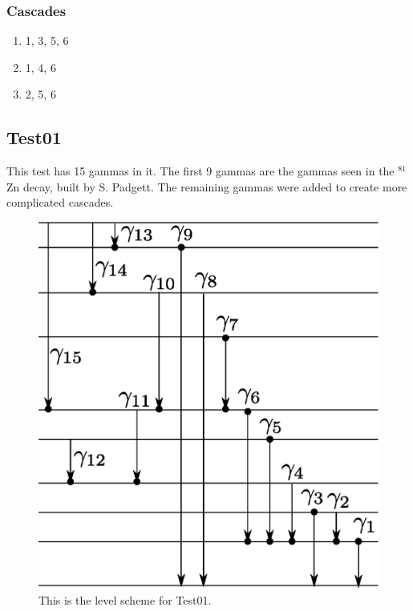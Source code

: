 \documentclass[12pt]{article}
\begin{document}
\subsubsection{Cascades}
\begin{enumerate}
\item 1, 3, 5, 6
\item 1, 4, 6
\item 2, 5, 6
\end{enumerate}
\subsection{Test01}
This test has 15 gammas in it. The first 9 gammas are the gammas seen in the 
$^{81}$Zn decay, built by S. Padgett. The remaining gammas were added to create 
more complicated cascades.
\begin{figure} [t]
  \begin{center}
    \includegraphics[width=4.5in]{../pictures/test01.eps}
    \caption{This is the level scheme for Test01.}
    \label{fig:test01}
  \end{center}
\end{figure}
\end{document}
